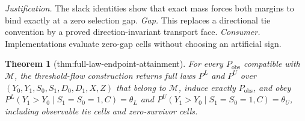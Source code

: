 \documentclass{article}
\newtheorem{theorem}{Theorem}
\begin{document}
\par\smallskip\noindent \textit{Justification.} The slack identities show that exact mass forces both margins to bind exactly at a zero selection gap. \textit{Gap.} This replaces a directional tie convention by a proved direction-invariant transport face. \textit{Consumer.} Implementations evaluate zero-gap cells without choosing an artificial sign.

\begin{theorem}[thm:full-law-endpoint-attainment]\label{thm:full-law-endpoint-attainment}
For every \(P_{\mathrm{obs}}\) compatible with \(\mathcal M\), the threshold-flow construction returns full laws \(P^L\) and \(P^U\) over \((Y_0,Y_1,S_0,S_1,D_0,D_1,X,Z)\) that belong to \(\mathcal M\), induce exactly \(P_{\mathrm{obs}}\), and obey \(P^L(Y_1>Y_0\mid S_1=S_0=1,C)=\theta_L\) and \(P^U(Y_1>Y_0\mid S_1=S_0=1,C)=\theta_U\), including observable tie cells and zero-survivor cells.
\end{theorem}
\end{document}
